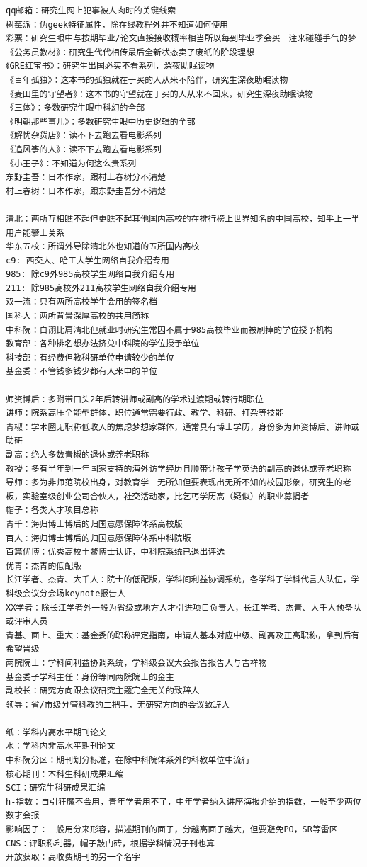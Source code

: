 \documentclass[]{book}
\begin{document}
\begin{verbatim}
qq邮箱：研究生网上犯事被人肉时的关键线索
树莓派：伪geek特征属性，除在线教程外并不知道如何使用
彩票：研究生眼中与按期毕业/论文直接接收概率相当所以每到毕业季会买一注来碰碰手气的梦
《公务员教材》：研究生代代相传最后全新状态卖了废纸的阶段理想
《GRE红宝书》：研究生出国必买不看系列，深夜助眠读物
《百年孤独》：这本书的孤独就在于买的人从来不陪伴，研究生深夜助眠读物
《麦田里的守望者》：这本书的守望就在于买的人从来不回来，研究生深夜助眠读物
《三体》：多数研究生眼中科幻的全部
《明朝那些事儿》：多数研究生眼中历史逻辑的全部
《解忧杂货店》：读不下去跑去看电影系列
《追风筝的人》：读不下去跑去看电影系列
《小王子》：不知道为何这么贵系列
东野圭吾：日本作家，跟村上春树分不清楚
村上春树：日本作家，跟东野圭吾分不清楚

清北：两所互相瞧不起但更瞧不起其他国内高校的在排行榜上世界知名的中国高校，知乎上一半用户能攀上关系
华东五校：所谓外导除清北外也知道的五所国内高校
c9: 西交大、哈工大学生网络自我介绍专用
985: 除c9外985高校学生网络自我介绍专用
211: 除985高校外211高校学生网络自我介绍专用
双一流：只有两所高校学生会用的签名档
国科大：两所背景深厚高校的共用简称
中科院：自诩比肩清北但就业时研究生常因不属于985高校毕业而被刷掉的学位授予机构
教育部：各种排名想办法挤兑中科院的学位授予单位
科技部：有经费但教科研单位申请较少的单位
基金委：不管钱多钱少都有人来申的单位

师资博后：多附带口头2年后转讲师或副高的学术过渡期或转行期职位
讲师：院系高压全能型群体，职位通常需要行政、教学、科研、打杂等技能
青椒：学术圈无职称低收入的焦虑梦想家群体，通常具有博士学历，身份多为师资博后、讲师或助研
副高：绝大多数青椒的退休或养老职称
教授：多有半年到一年国家支持的海外访学经历且顺带让孩子学英语的副高的退休或养老职称
导师：多为非师范院校出身，对教育学一无所知但要表现出无所不知的校园形象，研究生的老板，实验室级创业公司合伙人，社交活动家，比乞丐学历高（疑似）的职业募捐者
帽子：各类人才项目总称
青千：海归博士博后的归国意愿保障体系高校版
百人：海归博士博后的归国意愿保障体系中科院版
百篇优博：优秀高校土鳖博士认证，中科院系统已退出评选
优青：杰青的低配版
长江学者、杰青、大千人：院士的低配版，学科间利益协调系统，各学科子学科代言人队伍，学科级会议分会场keynote报告人
XX学者：除长江学者外一般为省级或地方人才引进项目负责人，长江学者、杰青、大千人预备队或评审人员
青基、面上、重大：基金委的职称评定指南，申请人基本对应中级、副高及正高职称，拿到后有希望晋级
两院院士：学科间利益协调系统，学科级会议大会报告报告人与吉祥物
基金委子学科主任：身份等同两院院士的金主
副校长：研究方向跟会议研究主题完全无关的致辞人
领导：省/市级分管科教的二把手，无研究方向的会议致辞人

纸：学科内高水平期刊论文
水：学科内非高水平期刊论文
中科院分区：期刊划分标准，在除中科院体系外的科教单位中流行
核心期刊：本科生科研成果汇编
SCI：研究生科研成果汇编
h-指数：自引狂魔不会用，青年学者用不了，中年学者纳入讲座海报介绍的指数，一般至少两位数才会报
影响因子：一般用分来形容，描述期刊的面子，分越高面子越大，但要避免PO，SR等雷区
CNS：评职称利器，帽子敲门砖，根据学科情况子刊也算
开放获取：高收费期刊的另一个名字
\end{verbatim}
\end{document}
